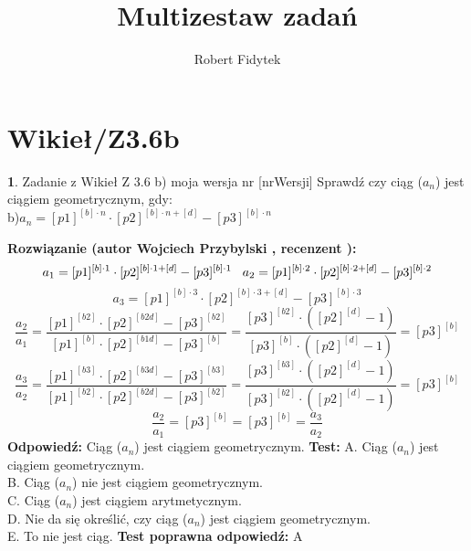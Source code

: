 \documentclass[12pt, a4paper]{article}
\title{Multizestaw zadań}
\author{Robert Fidytek}
\date{}
\theoremstyle{definition} %
\newtheorem{zad}{}
\newcommand{\kategoria}[1]{\section{#1}} %
\newcommand{\zadStart}[1]{\begin{zad}#1\newline} %
\newcommand{\zadStop}{\end{zad}}   %
\newcommand{\rozwStart}[2]{\noindent \textbf{Rozwiązanie (autor #1 , recenzent #2): }\newline} %
\newcommand{\rozwStop}{\newline}                                            %
\newcommand{\odpStart}{\noindent \textbf{Odpowiedź:}\newline}    %
\newcommand{\odpStop}{\newline}                                             %
\newcommand{\testStart}{\noindent \textbf{Test:}\newline} %
\newcommand{\testStop}{\newline} %
\newcommand{\kluczStart}{\noindent \textbf{Test poprawna odpowiedź:}\newline} %
\newcommand{\kluczStop}{\newline} %
\begin{document}
\maketitle


\kategoria{Wikieł/Z3.6b}
\zadStart{Zadanie z Wikieł Z 3.6 b) moja wersja nr [nrWersji]}
Sprawdź czy ciąg ($a_{n}$) jest ciągiem geometrycznym, gdy:\\
b)$a_{n}=[p1]^{[b]\cdot n}\cdot[p2]^{[b]\cdot n+[d]}-[p3]^{[b]\cdot n}$
\zadStop
\rozwStart{Wojciech Przybylski}{}
$$a_{1}=[p1]^{[b]\cdot 1}\cdot[p2]^{[b]\cdot 1+[d]}-[p3]^{[b]\cdot 1}\hspace{3mm}a_{2}=[p1]^{[b]\cdot 2}\cdot[p2]^{[b]\cdot 2+[d]}-[p3]^{[b]\cdot 2}$$
$$a_{3}=[p1]^{[b]\cdot 3}\cdot[p2]^{[b]\cdot 3+[d]}-[p3]^{[b]\cdot 3} $$
$$\frac{a_{2}}{a_{1}}=\frac{[p1]^{[b2]}\cdot [p2]^{[b2d]}-[p3]^{[b2]}}{[p1]^{[b]}\cdot [p2]^{[b1d]}-[p3]^{[b]}}=\frac{[p3]^{[b2]}\cdot([p2]^{[d]}-1)}{[p3]^{[b]}\cdot([p2]^{[d]}-1)}=[p3]^{[b]} $$
$$\frac{a_{3}}{a_{2}}=\frac{[p1]^{[b3]}\cdot [p2]^{[b3d]}-[p3]^{[b3]}}{[p1]^{[b2]}\cdot [p2]^{[b2d]}-[p3]^{[b2]}}=\frac{[p3]^{[b3]}\cdot([p2]^{[d]}-1)}{[p3]^{[b2]}\cdot([p2]^{[d]}-1)}=[p3]^{[b]} $$
$$\frac{a_{2}}{a_{1}}=[p3]^{[b]}=[p3]^{[b]}=\frac{a_{3}}{a_{2}}$$
\rozwStop
\odpStart
Ciąg ($a_{n}$) jest ciągiem geometrycznym.
\odpStop
\testStart
A. Ciąg ($a_{n}$) jest ciągiem geometrycznym.\\
B. Ciąg ($a_{n}$) nie jest ciągiem geometrycznym.\\
C. Ciąg ($a_{n}$) jest ciągiem arytmetycznym.\\
D. Nie da się określić, czy ciąg ($a_{n}$) jest ciągiem geometrycznym.\\
E. To nie jest ciąg.
\testStop
\kluczStart
A
\kluczStop
\end{document}
